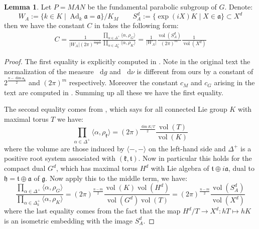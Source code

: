 \documentclass[11pt]{report}
\theoremstyle{definition}
\newtheorem{Lemma}[Def]{Lemma}
\theoremstyle{plain}
\DeclareMathOperator{\Ad}{Ad}
\DeclareMathOperator{\vol}{vol}
\newcommand{\brac}[1]{\langle #1 \rangle}
\newcommand{\mass}[1]{\mathop{}\mathrm{d}{#1}}
\newcommand{\Lie}[1]{\mathfrak{#1}}
\begin{document}
\begin{Lemma}\label{olbrich5.1}
	Let $P=MAN$ be the fundamental parabolic subgroup of $G$. Denote:
\begin{equation}
W_A:=\{k\in K\mid \Ad_k\Lie{a}=\Lie{a}\}/K_M \qquad S^d_A:=\{\exp(iX)K\mid X\in \Lie{a}\}\subset X^d
\end{equation}
then we have the constant $C$ in  takes the following form:
\begin{equation}
\begin{split}
C=\frac{1}{|W_A|(2\pi)^{\frac{n+m}{2}}}\frac{\prod_{\alpha\in \Delta^+}\brac{\alpha, \rho_{G}}}{\prod_{\alpha\in \Delta^+_k}\brac{\alpha, \rho_{K}}}=\frac{1}{|W_A|}\frac{\vol(S^d_A)}{(2\pi)^m}\frac{1}{\vol(X^d)}
\end{split}
\end{equation}
\end{Lemma}
\begin{proof}
The first equality is explicitly computed in \cite[Theorem~27.3]{harish1976}. Note in the original text the normalization of the measure $\mass{g}$ and $\mass{\nu}$ is different from ours by a constant of $2^{\frac{n-\dim \Lie{a}_0}{2}}$ and $(2\pi)^m$  respectively. Moreover the constant $c_M$ and $c_G$ arising in the text are computed in \cite[Theorem~37.1]{harish1975}. Summing up all these we have the first equality.
\par The second equality comes from \cite[Lemma~37.4]{harish1975}, which says for all connected Lie group $K$ with maximal torus $T$ we have:
\begin{equation}
\prod_{\alpha\in \Delta^+}\brac{\alpha, \rho_{\Lie{k}}}=(2\pi)^{\frac{\dim K/T}{2}}\frac{\vol(T)}{\vol(K)}
\end{equation}
where the volume are those induced by $\brac{-,-}$ on the left-hand side and $\Delta^+$ is a positive root system associated with $(\Lie{k,t})$. Now in particular this holds for the compact dual $G^d$, which has maximal torus $H^d$ with Lie algebra of $\Lie{t}\oplus i\Lie{a}$, dual to $\Lie{h}=\Lie{t}\oplus \Lie{a}$ of $\Lie{g}$. Now apply this to the middle term, we have:
\begin{equation}
\frac{\prod_{\alpha\in \Delta^+}\brac{\alpha, \rho_{G}}}{\prod_{\alpha\in \Delta^+_k}\brac{\alpha, \rho_{K}}}=(2\pi)^{\frac{n-m}{2}}\frac{\vol(K)\vol(H^d)}{\vol(G^d)\vol(T)}=(2\pi)^{\frac{n-m}{2}}\frac{\vol(S^d_A)}{\vol(X^d)}
\end{equation}
where the last equality comes from the fact that the map $H^d/T\to X^d: hT\mapsto hK$ is an isometric embedding with the image $S^d_A$.
\end{proof}
\end{document}
